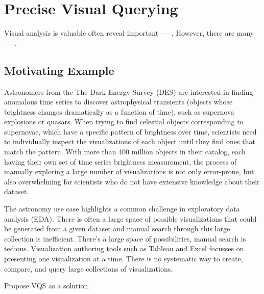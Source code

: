 \section{Precise Visual Querying\label{sec:precise}}
Visual analysis is valuable often reveal important -----. However, there are many -----. 

\subsection{Motivating Example}
Astronomers from the The Dark Energy Survey (DES)\cite{Drlica-Wagner2017} are interested in finding anomalous time series to discover astrophysical transients (objects whose brightness changes dramatically as a function of time), such as supernova explosions or quasars. When trying to find celestial objects corresponding to supernovae, which have a specific pattern of brightness over time, scientists need to individually inspect the visualizations of each object until they find ones that match the pattern. With more than 400 million objects in their catalog, each having their own set of time series brightness measurement, the process of manually exploring a large number of visualizations is not only error-prone, but also overwhelming for scientists who do not have extensive knowledge about their dataset.  
\par The astronomy use case highlights a common challenge in exploratory data analysis (EDA). There is often a large space of possible visualizations that could be generated from a given dataset and manual search through this large collection is inefficient.
There’s a large space of possibilities, manual search is tedious. Visualization authoring tools such as Tableau and Excel focusses on presenting one visualization at a time. There is no systematic way to create, compare, and query large collections of visualizations. 


Propose VQS as a solution\cite{Lee2017}. 

